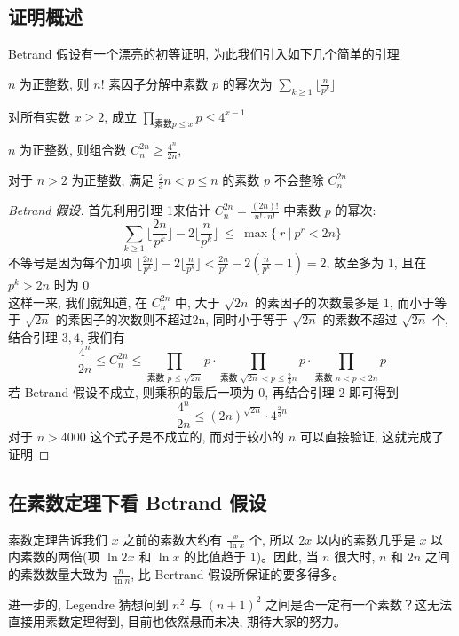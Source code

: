 \documentclass[main]{subfiles}
\begin{document}
\subsection{证明概述}
Betrand 假设有一个漂亮的初等证明, 为此我们引入如下几个简单的引理
\begin{lemma} [Legendre 定理]
    $n$ 为正整数, 则 $n!$ 素因子分解中素数 $p$ 的幂次为 $\sum_{k \geqslant 1} \lfloor \frac{n}{p^k} \rfloor $
\end{lemma}
\begin{lemma}
    对所有实数 $x \geqslant 2$, 成立 $\prod_{\text{素数} p \leqslant x } p \leqslant 4^{x-1}$
\end{lemma}
\begin{lemma}
    $n$ 为正整数, 则组合数 $C_{n}^{2n} \geqslant \frac{4^n}{2n}$,
\end{lemma}
\begin{lemma}
    对于 $n>2$ 为正整数, 满足 $\frac{2}{3}n < p \leqslant n $ 的素数 $p$ 不会整除 $C_{n}^{2n}$
\end{lemma}
\begin{proof}[Betrand 假设]
    首先利用引理 1来估计 $C_{n}^{2n} = \frac{(2n)!}{n! \cdot n!}$ 中素数 $p$ 的幂次: 
    \[ \sum_{k \geqslant 1} \lfloor \frac{2n}{p^k} \rfloor - 2 \lfloor \frac{n}{p^k} \rfloor  ~ \leqslant ~ \max \{ ~ r ~ |  ~ p^r < 2n \}\]
    不等号是因为每个加项  $\lfloor \frac{2n}{p^k} \rfloor - 2 \lfloor \frac{n}{p^k} \rfloor < \frac{2n}{p^k} - 2 (\frac{n}{p^k} - 1) = 2$, 故至多为 $1$, 且在 $p^k > 2n $ 时为 $0$\\
    这样一来, 我们就知道, 在 $C_{n}^{2n}$ 中, 大于 $\sqrt{2n}$ 的素因子的次数最多是 $1$, 而小于等于 $\sqrt{2n}$ 的素因子的次数则不超过2n, 同时小于等于 $\sqrt{2n} $ 的素数不超过 $\sqrt{2n}$ 个, 结合引理 $3,4$, 我们有
    \[ \frac{4^n}{2n} \leqslant C_{n}^{2n} \leqslant \prod_{\text{素数 }p \leqslant \sqrt{2n}} p  \cdot \prod_{\text{素数 }\sqrt{2n} < p \leqslant \frac{2}{3}n} p \cdot \prod_{\text{素数 }n < p < 2n} p \]
    若 Betrand 假设不成立, 则乘积的最后一项为 $0$, 再结合引理 $2$ 即可得到
    \[ \frac{4^n}{2n} \leqslant (2n)^{\sqrt{2n}} \cdot 4^{\frac{2}{3}n}  \]
    对于 $n>4000$ 这个式子是不成立的, 而对于较小的 $n$ 可以直接验证, 这就完成了证明
\end{proof}

\subsection{在素数定理下看 Betrand 假设}
素数定理告诉我们 $x$ 之前的素数大约有 $\frac{x}{\ln x}$ 个, 所以 $2 x$ 以内的素数几乎是 $x$ 以内素数的两倍(项 $\ln 2x$ 和 $\ln x$ 的比值趋于 $1$)。因此, 当 $n$ 很大时, $n$ 和 $2 n$ 之间的素数数量大致为 $\frac{n}{\ln n}$, 比 Bertrand 假设所保证的要多得多。
\par 进一步的, Legendre 猜想问到 $n^2$ 与 $(n+1)^2$ 之间是否一定有一个素数？这无法直接用素数定理得到, 目前也依然悬而未决, 期待大家的努力。
\end{document}
